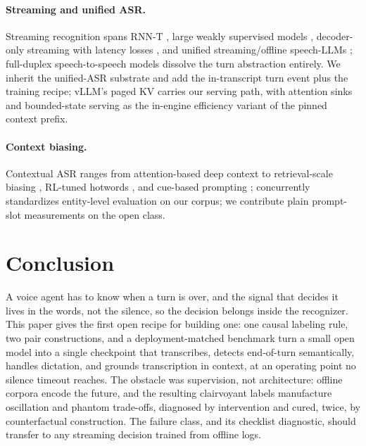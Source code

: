 \documentclass[11pt]{article}
\begin{document}
\paragraph{Streaming and unified ASR.} Streaming recognition spans RNN-T \citep{graves2012sequence}, large weakly supervised models \citep{radford2023whisper}, decoder-only streaming with latency losses \citep{wan2026streaming}, and unified streaming/offline speech-LLMs \citep{qwen3asr2026}; full-duplex speech-to-speech models \citep{defossez2024moshi} dissolve the turn abstraction entirely. We inherit the unified-ASR substrate and add the in-transcript turn event plus the training recipe; vLLM's paged KV \citep{kwon2023vllm} carries our serving path, with attention sinks \citep{xiao2024streamingllm} and bounded-state serving \citep{li2026metronome} as the in-engine efficiency variant of the pinned context prefix.

\paragraph{Context biasing.} Contextual ASR ranges from attention-based deep context \citep{pundak2018deep} to retrieval-scale biasing \citep{brasr2025}, RL-tuned hotwords \citep{hotwordgrpo2025}, and cue-based prompting \citep{commoncues2026}; \citet{contextualearnings2026} concurrently standardizes entity-level evaluation on our corpus; we contribute plain prompt-slot measurements on the open class.

\section{Conclusion}
\label{sec:conclusion}

A voice agent has to know when a turn is over, and the signal that decides it lives in the words, not the silence, so the decision belongs inside the recognizer. This paper gives the first open recipe for building one: one causal labeling rule, two pair constructions, and a deployment-matched benchmark turn a small open model into a single checkpoint that transcribes, detects end-of-turn semantically, handles dictation, and grounds transcription in context, at an operating point no silence timeout reaches. The obstacle was supervision, not architecture: offline corpora encode the future, and the resulting clairvoyant labels manufacture oscillation and phantom trade-offs, diagnosed by intervention and cured, twice, by counterfactual construction. The failure class, and its checklist diagnostic, should transfer to any streaming decision trained from offline logs.
\end{document}
